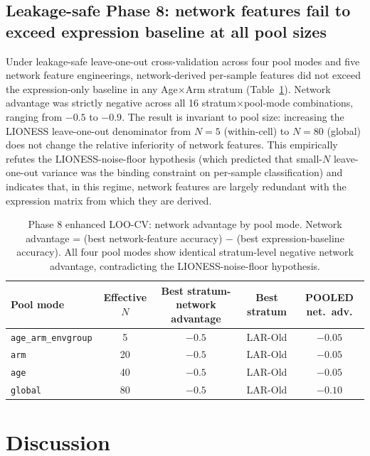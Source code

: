 \documentclass[11pt]{article}
\newcommand{\code}[1]{\texttt{#1}}
\begin{document}
\subsection{Leakage-safe Phase 8: network features fail to exceed expression baseline at all pool sizes}

Under leakage-safe leave-one-out cross-validation across four pool modes and five network feature engineerings, network-derived per-sample features did not exceed the expression-only baseline in any Age$\times$Arm stratum (Table~\ref{tab:phase8}). Network advantage was strictly negative across all 16 stratum$\times$pool-mode combinations, ranging from $-0.5$ to $-0.9$. The result is invariant to pool size: increasing the LIONESS leave-one-out denominator from $N{=}5$ (within-cell) to $N{=}80$ (global) does not change the relative inferiority of network features. This empirically refutes the LIONESS-noise-floor hypothesis (which predicted that small-$N$ leave-one-out variance was the binding constraint on per-sample classification) and indicates that, in this regime, network features are largely redundant with the expression matrix from which they are derived.

\begin{table}[h]
\centering\small
\begin{tabular}{lcccc}
\toprule
Pool mode & Effective $N$ & Best stratum-network advantage & Best stratum & POOLED net.\ adv. \\
\midrule
\code{age\_arm\_envgroup} & 5 & $-0.5$ & LAR-Old & $-0.05$ \\
\code{arm} & 20 & $-0.5$ & LAR-Old & $-0.05$ \\
\code{age} & 40 & $-0.5$ & LAR-Old & $-0.05$ \\
\code{global} & 80 & $-0.5$ & LAR-Old & $-0.10$ \\
\bottomrule
\end{tabular}
\caption{Phase 8 enhanced LOO-CV: network advantage by pool mode. Network advantage = (best network-feature accuracy) $-$ (best expression-baseline accuracy). All four pool modes show identical stratum-level negative network advantage, contradicting the LIONESS-noise-floor hypothesis.}
\label{tab:phase8}
\end{table}

\section{Discussion}
\end{document}
